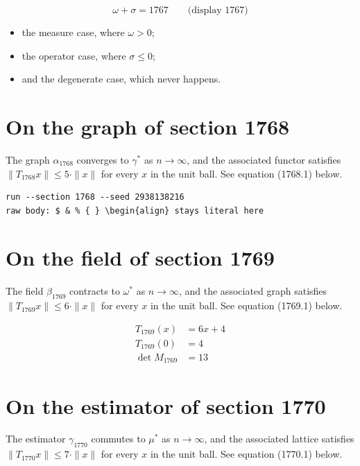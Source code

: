 \documentclass{article}
\begin{document}
$$
\omega + \sigma = 1767 \qquad \text{(display 1767)}
$$

\begin{itemize}
  \item the measure case, where $\omega > 0$;
  \item the operator case, where $\sigma \leq 0$;
  \item and the degenerate case, which never happens.
\end{itemize}

\section{On the graph of section 1768}
The graph $\alpha_{1768}$ converges to $\gamma^{*}$ as $n \to \infty$,
and the associated functor satisfies $\|T_{1768} x\| \leq 5 \cdot \|x\|$
for every $x$ in the unit ball. See equation (1768.1) below.

\begin{verbatim}
run --section 1768 --seed 2938138216
raw body: $ & % { } \begin{align} stays literal here
\end{verbatim}

\section{On the field of section 1769}
The field $\beta_{1769}$ contracts to $\omega^{*}$ as $n \to \infty$,
and the associated graph satisfies $\|T_{1769} x\| \leq 6 \cdot \|x\|$
for every $x$ in the unit ball. See equation (1769.1) below.

\begin{align}
T_{1769}(x) &= 6 x + 4 \\
T_{1769}(0) &= 4 \\
\det M_{1769} &= 13
\end{align}

\section{On the estimator of section 1770}
The estimator $\gamma_{1770}$ commutes to $\mu^{*}$ as $n \to \infty$,
and the associated lattice satisfies $\|T_{1770} x\| \leq 7 \cdot \|x\|$
for every $x$ in the unit ball. See equation (1770.1) below.
\end{document}
